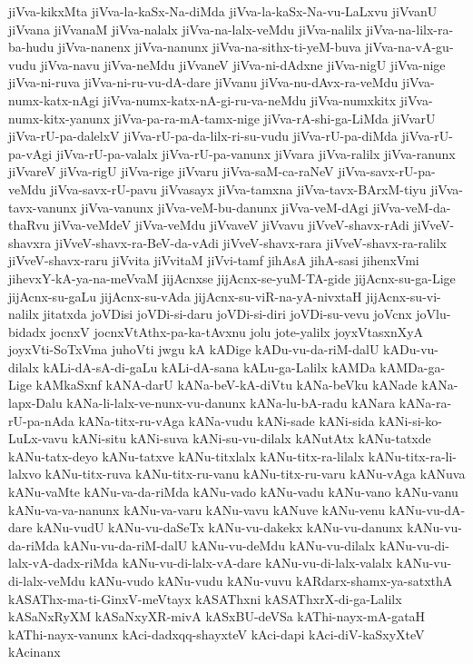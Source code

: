 {jiVva-kikxMta
jiVva-la-kaSx-Na-diMda
jiVva-la-kaSx-Na-vu-LaLxvu
jiVvanU
jiVvana
jiVvanaM
jiVva-nalalx
jiVva-na-lalx-veMdu
jiVva-nalilx
jiVva-na-lilx-ra-ba-hudu
jiVva-nanenx
jiVva-nanunx
jiVva-na-sithx-ti-yeM-buva
jiVva-na-vA-gu-vudu
jiVva-navu
jiVva-neMdu
jiVvaneV
jiVva-ni-dAdxne
jiVva-nigU
jiVva-nige
jiVva-ni-ruva
jiVva-ni-ru-vu-dA-dare
jiVvanu
jiVva-nu-dAvx-ra-veMdu
jiVva-numx-katx-nAgi
jiVva-numx-katx-nA-gi-ru-va-neMdu
jiVva-numxkitx
jiVva-numx-kitx-yanunx
jiVva-pa-ra-mA-tamx-nige
jiVva-rA-shi-ga-LiMda
jiVvarU
jiVva-rU-pa-dalelxV
jiVva-rU-pa-da-lilx-ri-su-vudu
jiVva-rU-pa-diMda
jiVva-rU-pa-vAgi
jiVva-rU-pa-valalx
jiVva-rU-pa-vanunx
jiVvara
jiVva-ralilx
jiVva-ranunx
jiVvareV
jiVva-rigU
jiVva-rige
jiVvaru
jiVva-saM-ca-raNeV
jiVva-savx-rU-pa-veMdu
jiVva-savx-rU-pavu
jiVvasayx
jiVva-tamxna
jiVva-tavx-BArxM-tiyu
jiVva-tavx-vanunx
jiVva-vanunx
jiVva-veM-bu-danunx
jiVva-veM-dAgi
jiVva-veM-da-thaRvu
jiVva-veMdeV
jiVva-veMdu
jiVvaveV
jiVvavu
jiVveV-shavx-rAdi
jiVveV-shavxra
jiVveV-shavx-ra-BeV-da-vAdi
jiVveV-shavx-rara
jiVveV-shavx-ra-ralilx
jiVveV-shavx-raru
jiVvita
jiVvitaM
jiVvi-tamf
jihAsA
jihA-sasi
jihenxVmi
jihevxY-kA-ya-na-meVvaM
jijAcnxse
jijAcnx-se-yuM-TA-gide
jijAcnx-su-ga-Lige
jijAcnx-su-gaLu
jijAcnx-su-vAda
jijAcnx-su-viR-na-yA-nivxtaH
jijAcnx-su-vi-nalilx
jitatxda
joVDisi
joVDi-si-daru
joVDi-si-diri
joVDi-su-vevu
joVcnx
joVlu-bidadx
jocnxV
jocnxVtAthx-pa-ka-tAvxnu
jolu
jote-yalilx
joyxVtasxnXyA
joyxVti-SoTxVma
juhoVti
jwgu
kA
kADige
kADu-vu-da-riM-dalU
kADu-vu-dilalx
kALi-dA-sA-di-gaLu
kALi-dA-sana
kALu-ga-Lalilx
kAMDa
kAMDa-ga-Lige
kAMkaSxnf
kANA-darU
kANa-beV-kA-diVtu
kANa-beVku
kANade
kANa-lapx-Dalu
kANa-li-lalx-ve-nunx-vu-danunx
kANa-lu-bA-radu
kANara
kANa-ra-rU-pa-nAda
kANa-titx-ru-vAga
kANa-vudu
kANi-sade
kANi-sida
kANi-si-ko-LuLx-vavu
kANi-situ
kANi-suva
kANi-su-vu-dilalx
kANutAtx
kANu-tatxde
kANu-tatx-deyo
kANu-tatxve
kANu-titxlalx
kANu-titx-ra-lilalx
kANu-titx-ra-li-lalxvo
kANu-titx-ruva
kANu-titx-ru-vanu
kANu-titx-ru-varu
kANu-vAga
kANuva
kANu-vaMte
kANu-va-da-riMda
kANu-vado
kANu-vadu
kANu-vano
kANu-vanu
kANu-va-va-nanunx
kANu-va-varu
kANu-vavu
kANuve
kANu-venu
kANu-vu-dA-dare
kANu-vudU
kANu-vu-daSeTx
kANu-vu-dakekx
kANu-vu-danunx
kANu-vu-da-riMda
kANu-vu-da-riM-dalU
kANu-vu-deMdu
kANu-vu-dilalx
kANu-vu-di-lalx-vA-dadx-riMda
kANu-vu-di-lalx-vA-dare
kANu-vu-di-lalx-valalx
kANu-vu-di-lalx-veMdu
kANu-vudo
kANu-vudu
kANu-vuvu
kARdarx-shamx-ya-satxthA
kASAThx-ma-ti-GinxV-meVtayx
kASAThxni
kASAThxrX-di-ga-Lalilx
kASaNxRyXM
kASaNxyXR-mivA
kASxBU-deVSa
kAThi-nayx-mA-gataH
kAThi-nayx-vanunx
kAci-dadxqq-shayxteV
kAci-dapi
kAci-diV-kaSxyXteV
kAcinanx
}
